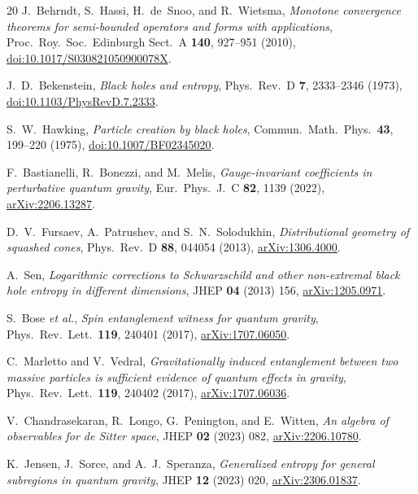 \documentclass[10pt,a4paper]{article}
\numberwithin{equation}{section}
\begin{document}
\begin{thebibliography}{20}
J.~Behrndt, S.~Hassi, H.~de~Snoo, and R.~Wietsma,
\emph{Monotone convergence theorems for semi-bounded operators and forms with applications},
Proc.\ Roy.\ Soc.\ Edinburgh Sect.\ A \textbf{140}, 927--951 (2010),
\href{https://doi.org/10.1017/S030821050900078X}{doi:10.1017/S030821050900078X}.

J.~D.~Bekenstein,
\emph{Black holes and entropy},
Phys.\ Rev.\ D \textbf{7}, 2333--2346 (1973),
\href{https://doi.org/10.1103/PhysRevD.7.2333}{doi:10.1103/PhysRevD.7.2333}.

S.~W.~Hawking,
\emph{Particle creation by black holes},
Commun.\ Math.\ Phys.\ \textbf{43}, 199--220 (1975),
\href{https://doi.org/10.1007/BF02345020}{doi:10.1007/BF02345020}.

F.~Bastianelli, R.~Bonezzi, and M.~Melis,
\emph{Gauge-invariant coefficients in perturbative quantum gravity},
Eur.\ Phys.\ J.\ C \textbf{82}, 1139 (2022),
\href{https://arxiv.org/abs/2206.13287}{arXiv:2206.13287}.

D.~V.~Fursaev, A.~Patrushev, and S.~N.~Solodukhin,
\emph{Distributional geometry of squashed cones},
Phys.\ Rev.\ D \textbf{88}, 044054 (2013),
\href{https://arxiv.org/abs/1306.4000}{arXiv:1306.4000}.

A.~Sen,
\emph{Logarithmic corrections to Schwarzschild and other non-extremal black hole entropy in different dimensions},
JHEP \textbf{04} (2013) 156,
\href{https://arxiv.org/abs/1205.0971}{arXiv:1205.0971}.

S.~Bose \emph{et al.},
\emph{Spin entanglement witness for quantum gravity},
Phys.\ Rev.\ Lett.\ \textbf{119}, 240401 (2017),
\href{https://arxiv.org/abs/1707.06050}{arXiv:1707.06050}.

C.~Marletto and V.~Vedral,
\emph{Gravitationally induced entanglement between two massive particles is sufficient evidence of quantum effects in gravity},
Phys.\ Rev.\ Lett.\ \textbf{119}, 240402 (2017),
\href{https://arxiv.org/abs/1707.06036}{arXiv:1707.06036}.

V.~Chandrasekaran, R.~Longo, G.~Penington, and E.~Witten,
\emph{An algebra of observables for de Sitter space},
JHEP \textbf{02} (2023) 082,
\href{https://arxiv.org/abs/2206.10780}{arXiv:2206.10780}.

K.~Jensen, J.~Sorce, and A.~J.~Speranza,
\emph{Generalized entropy for general subregions in quantum gravity},
JHEP \textbf{12} (2023) 020,
\href{https://arxiv.org/abs/2306.01837}{arXiv:2306.01837}.


\end{thebibliography}
\end{document}
